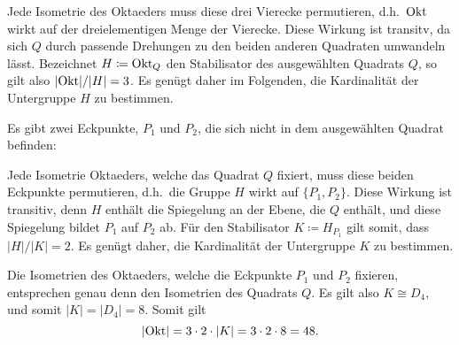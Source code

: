 \begin{itemize}
    Jede Isometrie des Oktaeders muss diese drei Vierecke permutieren, d.h.\ $\mathrm{Okt}$ wirkt auf der dreielementigen Menge der Vierecke.
    Diese Wirkung ist transitv, da sich $Q$ durch passende Drehungen zu den beiden anderen Quadraten umwandeln lässt.
    Bezeichnet $H \coloneqq \mathrm{Okt}_Q$ den Stabilisator des ausgewählten Quadrats $Q$, so gilt also $|{\mathrm{Okt}}|/|H| = 3$.
    Es genügt daher im Folgenden, die Kardinalität der Untergruppe $H$ zu bestimmen.

    Es gibt zwei Eckpunkte, $P_1$ und $P_2$, die sich nicht in dem ausgewählten Quadrat befinden:
    \begin{center}
    \end{center}
    Jede Isometrie Oktaeders, welche das Quadrat $Q$ fixiert, muss diese beiden Eckpunkte permutieren, d.h.\ die Gruppe $H$ wirkt auf $\{P_1, P_2\}$.
    Diese Wirkung ist transitiv, denn $H$ enthält die Spiegelung an der Ebene, die $Q$ enthält, und diese Spiegelung bildet $P_1$ auf $P_2$ ab.
    Für den Stabilisator $K \coloneqq H_{P_1}$ gilt somit, dass $|H|/|K| = 2$.
    Es genügt daher, die Kardinalität der Untergruppe $K$ zu bestimmen.
    
    Die Isometrien des Oktaeders, welche die Eckpunkte $P_1$ und $P_2$ fixieren, entsprechen genau denn den Isometrien des Quadrats $Q$.
    Es gilt also $K \cong D_4$, und somit $|K| = |D_4| = 8$.
    Somit gilt
    \[
        |{\mathrm{Okt}}|
      = 3 \cdot 2 \cdot |K|
      = 3 \cdot 2 \cdot 8
      = 48.
    \]
    

\end{itemize}
